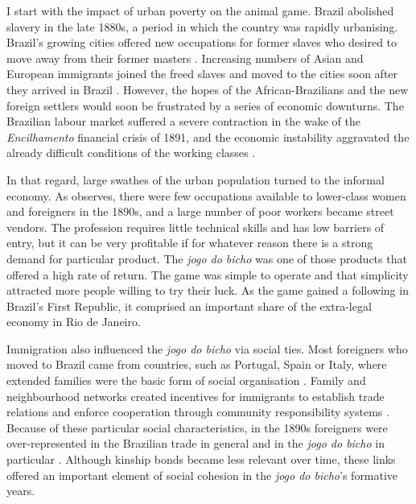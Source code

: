 \documentclass[a4paper,12pt]{article}
\begin{document}
I start with the impact of urban poverty on the animal game. Brazil abolished slavery in the late 1880s, a period in which the country was rapidly urbanising. Brazil's growing cities offered new occupations for former slaves who desired to move away from their former masters \citep{andrews1991blacks, skidmore1993black}. Increasing numbers of Asian and European immigrants joined the freed slaves and moved to the cities soon after they arrived in Brazil \citep{hall1969origins, lesser2013immigration}. However, the hopes of the African-Brazilians and the new foreign settlers would soon be frustrated by a series of economic downturns. The Brazilian labour market suffered a severe contraction in the wake of the \textit{Encilhamento} financial crisis of 1891, and the economic instability aggravated the already difficult conditions of the working classes \citep{topik2014political, triner2005baring}.

In that regard, large swathes of the urban population turned to the informal economy. As \citet[115]{chazkel2011laws} observes, there were few occupations available to lower-class women and foreigners in the 1890s, and a large number of poor workers became street vendors. The profession requires little technical skills and has low barriers of entry, but it can be very profitable if for whatever reason there is a strong demand for particular product. The \textit{jogo do bicho} was one of those products that offered a high rate of return. The game was simple to operate and that simplicity attracted more people willing to try their luck. As the game gained a following in Brazil's First Republic, it comprised an important share of the extra-legal economy in Rio de Janeiro.

Immigration also influenced the \textit{jogo do bicho} via social ties. Most foreigners who moved to Brazil came from countries, such as Portugal, Spain or Italy, where extended families were the basic form of social organisation \citep{lobo2001imigraccao, trento1989outro}. Family and neighbourhood networks created incentives for immigrants to establish trade relations and enforce cooperation through community responsibility systems \citep{roth2014prison}. Because of these particular social characteristics, in the 1890s foreigners were over-represented in the Brazilian trade in general \citep{mattos1991vadios, oliveira2001brasil} and in the \textit{jogo do bicho} in particular \citep{magalhaes2005ganhou, villar2008contravencao}. Although kinship bonds became less relevant over time, these links offered an important element of social cohesion in the \textit{jogo do bicho}'s formative years.
\end{document}
